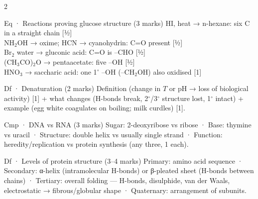 \documentclass[10pt,a4paper]{extarticle}
\newcommand{\mk}[1]{{\scriptsize\color{black!55}[#1]}}
\begin{document}
\begin{multicols}{2}
\begin{skel}{Eq · Reactions proving glucose structure (3 marks)}
HI, heat → n-hexane: six C in a straight chain \mk{½}\\
NH$_2$OH → oxime; HCN → cyanohydrin: C=O present \mk{½}\\
Br$_2$ water → gluconic acid: C=O is --CHO \mk{½}\\
(CH$_3$CO)$_2$O → pentaacetate: five --OH \mk{½}\\
HNO$_3$ → saccharic acid: one 1$^\circ$ --OH (--CH$_2$OH) also oxidised \mk{1}
\end{skel}
\begin{skel}{Df · Denaturation (2 marks)}
Definition (change in $T$ or pH → loss of biological activity) \mk{1} + what changes (H-bonds break, 2$^\circ$/3$^\circ$ structure lost, 1$^\circ$ intact) + example (egg white coagulates on boiling; milk curdles) \mk{1}.
\end{skel}
\begin{skel}{Cmp · DNA vs RNA (3 marks)}
Sugar: 2-deoxyribose vs ribose · Base: thymine vs uracil · Structure: double helix vs usually single strand · Function: heredity/replication vs protein synthesis (any three, 1 each).
\end{skel}
\begin{skel}{Df · Levels of protein structure (3--4 marks)}
Primary: amino acid sequence · Secondary: α-helix (intramolecular H-bonds) or β-pleated sheet (H-bonds between chains) · Tertiary: overall folding — H-bonds, disulphide, van der Waals, electrostatic → fibrous/globular shape · Quaternary: arrangement of subunits.
\end{skel}


\end{multicols}
\end{document}
